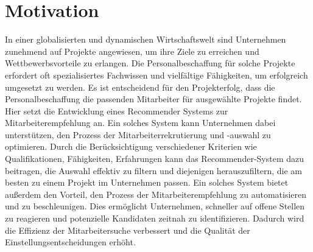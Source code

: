 \documentclass[a4paper,12pt]{scrreprt}
\newcommand{\hiddenchapter}[1]{
	\chapter*{{#1}}
}
\begin{document}
\pagestyle{empty}




\pagestyle{fancy}


\newpage

\newpage

\setcounter{page}{1}
\pagestyle{fancy}
\setcounter{chapter}{0}
\newpage

\hiddenchapter{Motivation}
In einer globalisierten und dynamischen Wirtschaftswelt sind Unternehmen zunehmend auf Projekte angewiesen, um ihre Ziele zu erreichen und Wettbewerbsvorteile zu erlangen. Die Personalbeschaffung für solche Projekte erfordert oft spezialisiertes Fachwissen und vielfältige Fähigkeiten, um erfolgreich umgesetzt zu werden. Es ist entscheidend für den Projekterfolg, dass die Personalbeschaffung die passenden Mitarbeiter für ausgewählte Projekte findet. Hier setzt die Entwicklung eines Recommender Systems zur Mitarbeiterempfehlung an. Ein solches System kann Unternehmen dabei unterstützen, den Prozess der Mitarbeiterrekrutierung und -auswahl zu optimieren. Durch die Berücksichtigung verschiedener Kriterien wie Qualifikationen, Fähigkeiten, Erfahrungen kann das Recommender-System dazu beitragen, die Auswahl effektiv zu filtern und diejenigen herauszufiltern, die am besten zu einem Projekt im Unternehmen passen. Ein solches System bietet außerdem den Vorteil, den Prozess der Mitarbeiterempfehlung zu automatisieren und zu beschleunigen. Dies ermöglicht Unternehmen, schneller auf offene Stellen zu reagieren und potenzielle Kandidaten zeitnah zu identifizieren. Dadurch wird die Effizienz der Mitarbeitersuche verbessert und die Qualität der Einstellungsentscheidungen erhöht.\\
\end{document}
